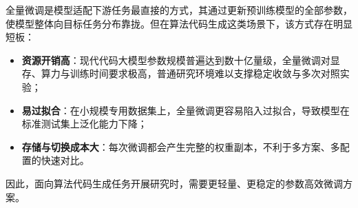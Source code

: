 
全量微调是模型适配下游任务最直接的方式，其通过更新预训练模型的全部参数，使模型整体向目标任务分布靠拢。但在算法代码生成这类场景下，该方式存在明显短板：
\begin{itemize}
    \item \textbf{资源开销高}：现代代码大模型参数规模普遍达到数十亿量级，全量微调对显存、算力与训练时间要求极高，普通研究环境难以支撑稳定收敛与多次对照实验；
    \item \textbf{易过拟合}：在小规模专用数据集上，全量微调更容易陷入过拟合，导致模型在标准测试集上泛化能力下降；
    \item \textbf{存储与切换成本大}：每次微调都会产生完整的权重副本，不利于多方案、多配置的快速对比。
\end{itemize}
因此，面向算法代码生成任务开展研究时，需要更轻量、更稳定的参数高效微调方案。